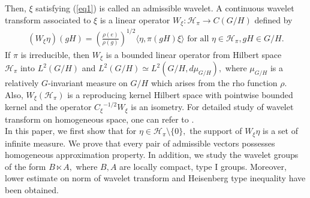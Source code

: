 \documentclass[11pt,reqno]{amsart}
\numberwithin{equation}{section}
\theoremstyle{definition}
\begin{document}
  Then, $\xi$ satisfying (\ref{eq1}) is called an admissible wavelet.
A continuous wavelet transform associated to $\xi$ is a linear operator $W_{\xi} : \mathcal{H}_{\pi} \to C(G/H) $ defined by 
 \begin{align*}
 (W_{\xi}\eta)(gH) = \left( \frac{\rho(e)}{\rho(g)}\right)^{1/2}\langle \eta, \pi(gH)\xi \rangle \text{ for all } \eta \in \mathcal{H}_{\pi}, gH \in G/H.
 \end{align*}  
\noindent If $\pi$ is irreducible, then $W_{\xi}$ is a bounded linear operator from Hilbert space $\mathcal{H}_{\pi} \text{ into } L^2(G/H)$ and $ L^2(G/H) \simeq L^2(G/H, d\mu_{G/H}),$ where $\mu_{G/H}$ is  a relatively $G$-invariant measure on $G/H$ which arises from the rho function $\rho.$ 
 Also, $W_{\xi}(\mathcal{H}_{\pi})$ is a reproducing kernel Hilbert space with pointwise bounded kernel and the operator ${C_{\xi}}^{-1/2}W_{\xi}$  is an isometry. For detailed study of wavelet transform on homogeneous space, one can refer to \cite{kam:12}.\\
In this paper, we first show that for  $\eta \in \mathcal{H}_{\pi}\setminus \{0\},$ the support of $W_{\xi}\eta$ is a set of infinite measure. We prove that every pair of admissible vectors possesses homogeneous approximation property. In addition, we study the wavelet groups of the form $B\ltimes A,$ where $B,A$ are locally  compact, type I groups. Moreover, lower estimate on norm of wavelet transform and Heisenberg type inequality have been obtained.
\end{document}
